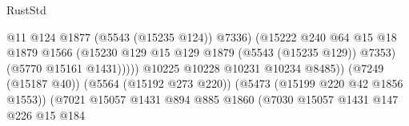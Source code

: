 \begin{lexlean}{RustStd}
\begin{coremodule}
                                                            @11
                                                            @124
                                                            @1877
                                                            (@5543 (@15235 @124))
                                                            @7336)
                                                          (@15222
                                                            @240
                                                            @64
                                                            @15
                                                            @18
                                                            @1879
                                                            @1566
                                                            (@15230
                                                              @129
                                                              @15
                                                              @129
                                                              @1879
                                                              (@5543 (@15235 @129))
                                                              @7353)
                                                            (@5770 @15161 @1431)))))
                                                    @10225
                                                    @10228
                                                    @10231
                                                    @10234
                                                    @8485))
                                                (@7249 (@15187 @40))
                                                (@5564 (@15192 @273 @220))
                                                (@5473 (@15199 @220 @42 @1856 @1553))
                                                (@7021
                                                  @15057
                                                  @1431
                                                  @894
                                                  @885
                                                  @1860
                                                  (@7030
                                                    @15057
                                                    @1431
                                                    @147
                                                    @226
                                                    @15
                                                    @184

\end{coremodule}
\end{lexlean}
